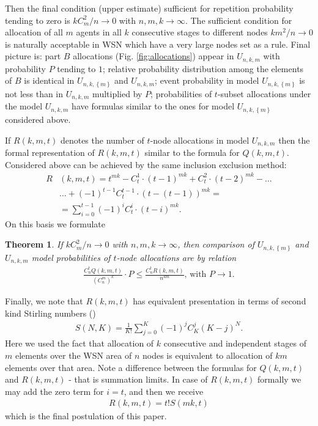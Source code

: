 \documentclass[conference]{IEEEtran}
\newtheorem{theorem}	{Theorem}
\begin{document}
Then the final condition (upper estimate) sufficient for repetition probability tending to zero is $kC_{m}^{2}/n\rightarrow 0$ with $n,m,k\rightarrow \infty$. The sufficient condition for allocation of all $m$ agents in all $k$ consecutive stages to different nodes $km^{2}/n\rightarrow 0$ is naturally acceptable in WSN which have a very large nodes set as a rule.
Final picture is: part $B$ allocations (Fig. \ref{fig:allocations}) appear in $U_{n,k,m}$ with probability $P$ tending to $1$; relative probability distribution among the elements of $B$ is identical in $U_{n,k,\left\{m\right\}}$ and $U_{n,k,m}$; event probability in model $U_{n,k,\left\{m\right\}}$ is not less than in $U_{n,k,m}$ multiplied by $P$; probabilities of  $t$-subset allocations under the model $U_{n,k,m}$ have formulas similar to the ones for model $U_{n,k,\left\{m\right\}}$ considered above.


If $R(k,m,t)$ denotes the number of $t$-node allocations in model $U_{n,k,m}$ then the formal representation of $R(k,m,t)$ similar to the formula for $Q(k,m,t)$. Considered above can be achieved by the same inclusion exclusion method:
\begin{align}
R&(k,m,t)=t^{mk} - C_{t}^{1} \cdot (t-1)^{mk} + C_{t}^{2} \cdot (t-2)^{mk} - \ldots \nonumber \\
&\ldots + (-1)^{t-1}C_{t}^{t-1} \cdot (t-(t-1))^{mk} = \nonumber \\ &=\sum_{i=0}^{t-1}(-1)^{i}C_{t}^{i} \cdot (t-i)^{mk}. \label{rkmtformula}
\end{align}
On this basis we formulate

\begin{theorem}
If $kC_{m}^{2}/n\rightarrow 0$ with $n,m,k\rightarrow \infty$, then comparison of $U_{n,k,\left\{m\right\}}$ and $U_{n,k,m}$ model probabilities of  $t$-node allocations are by relation
\begin{align}
	\frac{C_{n}^{t}Q(k,m,t)}{(C_{n}^{m})^k} \cdot P \leq \frac{C_{n}^{t}R(k,m,t)}{n^{km}} \text{, with }  P \rightarrow 1.
\end{align}
\end{theorem}
Finally, we note that $R(k,m,t)$ has equivalent presentation in terms of second kind Stirling numbers (\cite{chelluri}) 
\begin{align}
S(N,K) = \frac{1}{K!} \sum_{j=0}^{K}(-1)^{j}C_{K}^{j} (K-j)^N.
\end{align}
Here we used the fact that allocation of $k$ consecutive and independent stages of $m$ elements over the WSN area of $n$ nodes is equivalent to allocation of $km$ elements over that area. Note a difference between the formulas for $Q(k,m,t)$ and $R(k,m,t)$ - that is summation limits. In case of $R(k,m,t)$ formally we may add the zero term for $i=t$, and then we receive
\begin{align}
	R(k,m,t)=t!S(mk,t)
\end{align}
which is the final postulation of this paper.
\end{document}

